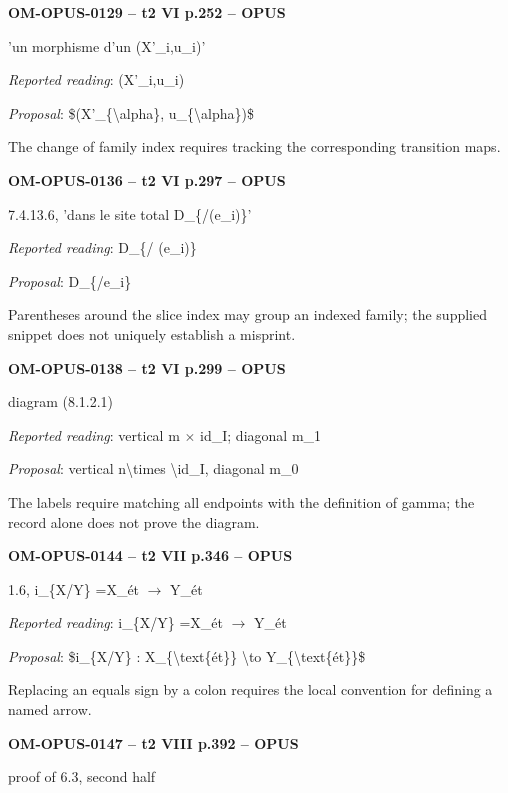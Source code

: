\par\noindent\textbf{OM-OPUS-0129 -- t2 VI p.252 -- OPUS}\par
'un morphisme d'un (X'\_i,u\_i)'\par
\emph{Reported reading}: (X'\_i,u\_i)\par
\emph{Proposal}: \$(X'\_\{\textbackslash{}alpha\}, u\_\{\textbackslash{}alpha\})\$\par
The change of family index requires tracking the corresponding transition maps.\par
\par\noindent\textbf{OM-OPUS-0136 -- t2 VI p.297 -- OPUS}\par
7.4.13.6, 'dans le site total D\_\{/(e\_i)\}'\par
\emph{Reported reading}: D\_\{/ (e\_i)\}\par
\emph{Proposal}: D\_\{/e\_i\}\par
Parentheses around the slice index may group an indexed family; the supplied snippet does not uniquely establish a misprint.\par
\par\noindent\textbf{OM-OPUS-0138 -- t2 VI p.299 -- OPUS}\par
diagram (8.1.2.1)\par
\emph{Reported reading}: vertical m \ensuremath{\times} id\_I; diagonal m\_1\par
\emph{Proposal}: vertical n\textbackslash{}times \textbackslash{}id\_I, diagonal m\_0\par
The labels require matching all endpoints with the definition of gamma; the record alone does not prove the diagram.\par
\par\noindent\textbf{OM-OPUS-0144 -- t2 VII p.346 -- OPUS}\par
1.6, i\_\{X/Y\} =\allowbreak  X\_ét \ensuremath{\to} Y\_ét\par
\emph{Reported reading}: i\_\{X/Y\} =\allowbreak  X\_ét \ensuremath{\to} Y\_ét\par
\emph{Proposal}: \$i\_\{X/Y\} : X\_\{\textbackslash{}text\{ét\}\} \textbackslash{}to Y\_\{\textbackslash{}text\{ét\}\}\$\par
Replacing an equals sign by a colon requires the local convention for defining a named arrow.\par
\par\noindent\textbf{OM-OPUS-0147 -- t2 VIII p.392 -- OPUS}\par
proof of 6.3, second half\par
